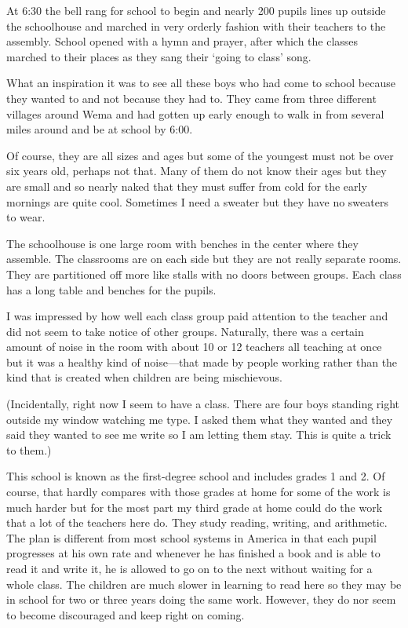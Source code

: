 \documentclass[
]{book}
\begin{document}
At 6:30 the bell rang for school to begin and nearly 200 pupils lines up outside the schoolhouse and marched in very orderly fashion with their teachers to the assembly. School opened with a hymn and prayer, after which the classes marched to their places as they sang their `going to class' song.

What an inspiration it was to see all these boys who had come to school because they wanted to and not because they had to. They came from three different villages around Wema and had gotten up early enough to walk in from several miles around and be at school by 6:00.

Of course, they are all sizes and ages but some of the youngest must not be over six years old, perhaps not that. Many of them do not know their ages but they are small and so nearly naked that they must suffer from cold for the early mornings are quite cool. Sometimes I need a sweater but they have no sweaters to wear.

The schoolhouse is one large room with benches in the center where they assemble. The classrooms are on each side but they are not really separate rooms. They are partitioned off more like stalls with no doors between groups. Each class has a long table and benches for the pupils.

I was impressed by how well each class group paid attention to the teacher and did not seem to take notice of other groups. Naturally, there was a certain amount of noise in the room with about 10 or 12 teachers all teaching at once but it was a healthy kind of noise---that made by people working rather than the kind that is created when children are being mischievous.

(Incidentally, right now I seem to have a class. There are four boys standing right outside my window watching me type. I asked them what they wanted and they said they wanted to see me write so I am letting them stay. This is quite a trick to them.)

This school is known as the first-degree school and includes grades 1 and 2. Of course, that hardly compares with those grades at home for some of the work is much harder but for the most part my third grade at home could do the work that a lot of the teachers here do. They study reading, writing, and arithmetic. The plan is different from most school systems in America in that each pupil progresses at his own rate and whenever he has finished a book and is able to read it and write it, he is allowed to go on to the next without waiting for a whole class. The children are much slower in learning to read here so they may be in school for two or three years doing the same work. However, they do nor seem to become discouraged and keep right on coming.
\end{document}
